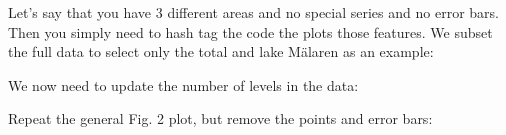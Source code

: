 \documentclass[]{article}
\newenvironment{Shaded}{\begin{snugshade}}{\end{snugshade}}
\newcommand{\KeywordTok}[1]{\textcolor[rgb]{0.13,0.29,0.53}{\textbf{#1}}}
\newcommand{\StringTok}[1]{\textcolor[rgb]{0.31,0.60,0.02}{#1}}
\newcommand{\OperatorTok}[1]{\textcolor[rgb]{0.81,0.36,0.00}{\textbf{#1}}}
\newcommand{\NormalTok}[1]{#1}
\begin{document}
Let's say that you have 3 different areas and no special series and no
error bars. Then you simply need to hash tag the code the plots those
features. We subset the full data to select only the total and lake
Mälaren as an example:

\begin{Shaded}
\end{Shaded}

We now need to update the number of levels in the data:

\begin{Shaded}
\end{Shaded}

Repeat the general Fig. 2 plot, but remove the points and error bars:
\end{document}
